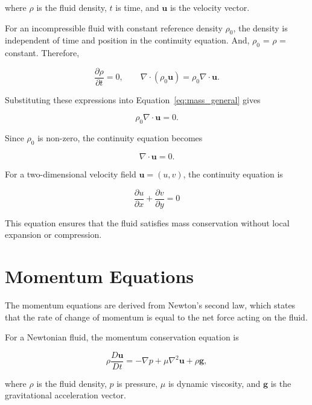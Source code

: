 \documentclass{article}
\begin{document}
where $\rho$ is the fluid density, $t$ is time, and
$\mathbf{u}$ is the velocity vector.

For an incompressible fluid with constant reference density
$\rho_0$, the density is independent of time and position
in the continuity equation. And, $\rho_0$ = $\rho$ = constant. Therefore,

\begin{equation}
\frac{\partial \rho}{\partial t}=0,
\qquad
\nabla\cdot(\rho_0\mathbf{u})
=\rho_0\nabla\cdot\mathbf{u}.
\end{equation}

Substituting these expressions into
Equation~\eqref{eq:mass_general} gives

\begin{equation}
\rho_0\nabla\cdot\mathbf{u}=0.
\end{equation}

Since $\rho_0$ is non-zero, the continuity equation becomes

\begin{equation}
\nabla\cdot\mathbf{u}=0.
\end{equation}

For a two-dimensional velocity field
$\mathbf{u}=(u,v)$, the continuity equation is

\begin{equation}
\boxed{
\frac{\partial u}{\partial x}
+\frac{\partial v}{\partial y}=0
}
\label{eq:continuity}
\end{equation}

This equation ensures that the fluid satisfies mass
conservation without local expansion or compression.

\section{Momentum Equations}

The momentum equations are derived from Newton's second law,
which states that the rate of change of momentum is equal to
the net force acting on the fluid.

For a Newtonian fluid, the momentum conservation equation is

\begin{equation}
\rho\frac{D\mathbf{u}}{Dt}
=-\nabla p+\mu\nabla^2\mathbf{u}
+\rho\mathbf{g},
\label{eq:momentum_general}
\end{equation}

where $\rho$ is the fluid density, $p$ is pressure, $\mu$ is
dynamic viscosity, and $\mathbf{g}$ is the gravitational
acceleration vector.
\end{document}
